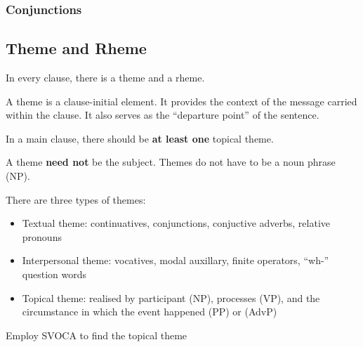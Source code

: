 \documentclass[../main.tex]{subfiles}
\begin{document}
        \subsubsection{Conjunctions}

    \subsection{Theme and Rheme}
        In every clause, there is a theme and a rheme. 

        A theme is a clause-initial element. It provides the context of the message carried within the clause. It also serves as the ``departure point'' of the sentence.
        
        In a main clause, there should be \textbf{at least one} topical theme. 

        A theme \textbf{need not} be the subject. Themes do not have to be a noun phrase (NP).

        There are three types of themes:\begin{itemize}
            \item Textual theme: continuatives, conjunctions, conjuctive adverbs, relative pronouns
            \item Interpersonal theme: vocatives, modal auxillary, finite operators, ``wh-'' question words
            \item Topical theme: realised by participant (NP), processes (VP), and the circumstance in which the event happened (PP) or (AdvP)
        \end{itemize}
        Employ SVOCA to find the topical theme

\end{document}
